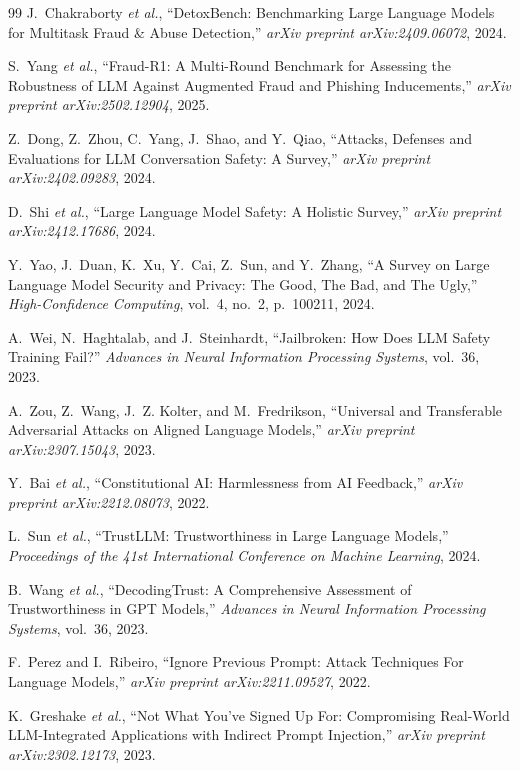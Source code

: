 \documentclass[10pt,letterpaper]{article}
\begin{document}
\begin{thebibliography}{99}
J.~Chakraborty \emph{et al.},
``DetoxBench: Benchmarking Large Language Models for Multitask Fraud \& Abuse Detection,''
\emph{arXiv preprint arXiv:2409.06072}, 2024.

S.~Yang \emph{et al.},
``Fraud-R1: A Multi-Round Benchmark for Assessing the Robustness of LLM Against Augmented Fraud and Phishing Inducements,''
\emph{arXiv preprint arXiv:2502.12904}, 2025.

Z.~Dong, Z.~Zhou, C.~Yang, J.~Shao, and Y.~Qiao,
``Attacks, Defenses and Evaluations for LLM Conversation Safety: A Survey,''
\emph{arXiv preprint arXiv:2402.09283}, 2024.

D.~Shi \emph{et al.},
``Large Language Model Safety: A Holistic Survey,''
\emph{arXiv preprint arXiv:2412.17686}, 2024.

Y.~Yao, J.~Duan, K.~Xu, Y.~Cai, Z.~Sun, and Y.~Zhang,
``A Survey on Large Language Model Security and Privacy: The Good, The Bad, and The Ugly,''
\emph{High-Confidence Computing}, vol.~4, no.~2, p.~100211, 2024.

A.~Wei, N.~Haghtalab, and J.~Steinhardt,
``Jailbroken: How Does LLM Safety Training Fail?''
\emph{Advances in Neural Information Processing Systems}, vol.~36, 2023.

A.~Zou, Z.~Wang, J.~Z. Kolter, and M.~Fredrikson,
``Universal and Transferable Adversarial Attacks on Aligned Language Models,''
\emph{arXiv preprint arXiv:2307.15043}, 2023.

Y.~Bai \emph{et al.},
``Constitutional AI: Harmlessness from AI Feedback,''
\emph{arXiv preprint arXiv:2212.08073}, 2022.

L.~Sun \emph{et al.},
``TrustLLM: Trustworthiness in Large Language Models,''
\emph{Proceedings of the 41st International Conference on Machine Learning}, 2024.

B.~Wang \emph{et al.},
``DecodingTrust: A Comprehensive Assessment of Trustworthiness in GPT Models,''
\emph{Advances in Neural Information Processing Systems}, vol.~36, 2023.

F.~Perez and I.~Ribeiro,
``Ignore Previous Prompt: Attack Techniques For Language Models,''
\emph{arXiv preprint arXiv:2211.09527}, 2022.

K.~Greshake \emph{et al.},
``Not What You've Signed Up For: Compromising Real-World LLM-Integrated Applications with Indirect Prompt Injection,''
\emph{arXiv preprint arXiv:2302.12173}, 2023.


\end{thebibliography}
\end{document}

